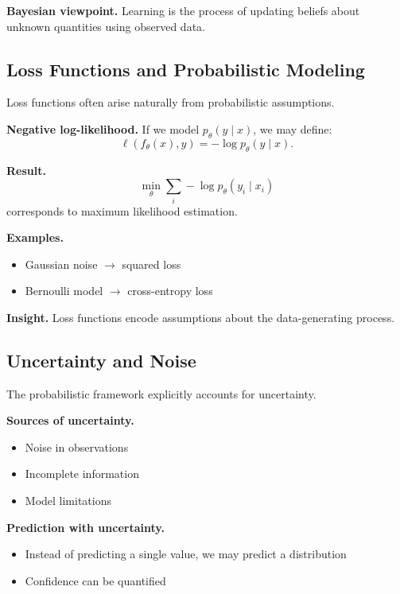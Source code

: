 \medskip

\noindent
\textbf{Bayesian viewpoint.}  
Learning is the process of updating beliefs about unknown quantities using observed data.

\subsection{Loss Functions and Probabilistic Modeling}

Loss functions often arise naturally from probabilistic assumptions.

\medskip

\noindent
\textbf{Negative log-likelihood.}  
If we model $p_\theta(y \mid x)$, we may define:
\[
\ell(f_\theta(x), y) = -\log p_\theta(y \mid x).
\]

\medskip

\noindent
\textbf{Result.}
\[
\min_\theta \sum_i -\log p_\theta(y_i \mid x_i)
\]
corresponds to maximum likelihood estimation.

\medskip

\noindent
\textbf{Examples.}
\begin{itemize}
    \item Gaussian noise $\rightarrow$ squared loss
    \item Bernoulli model $\rightarrow$ cross-entropy loss
\end{itemize}

\medskip

\noindent
\textbf{Insight.}  
Loss functions encode assumptions about the data-generating process.

\subsection{Uncertainty and Noise}

The probabilistic framework explicitly accounts for uncertainty.

\medskip

\noindent
\textbf{Sources of uncertainty.}
\begin{itemize}
    \item Noise in observations
    \item Incomplete information
    \item Model limitations
\end{itemize}

\medskip

\noindent
\textbf{Prediction with uncertainty.}
\begin{itemize}
    \item Instead of predicting a single value, we may predict a distribution
    \item Confidence can be quantified
\end{itemize}

